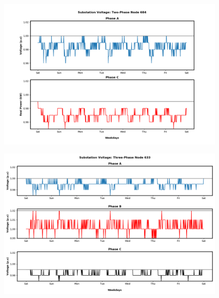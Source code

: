 \begin{figure}[H]
    \centering
    \includegraphics[width=1.1\columnwidth]{Pictures/basecase_two_phase_684_volt.png}
    \caption{ }
\end{figure}

\newpage

\begin{figure}[H]
    \centering
    \includegraphics[width=1.1\columnwidth]{Pictures/basecase_three_phase_633_volt.png}
    \caption{ }
\end{figure}
\newpage


